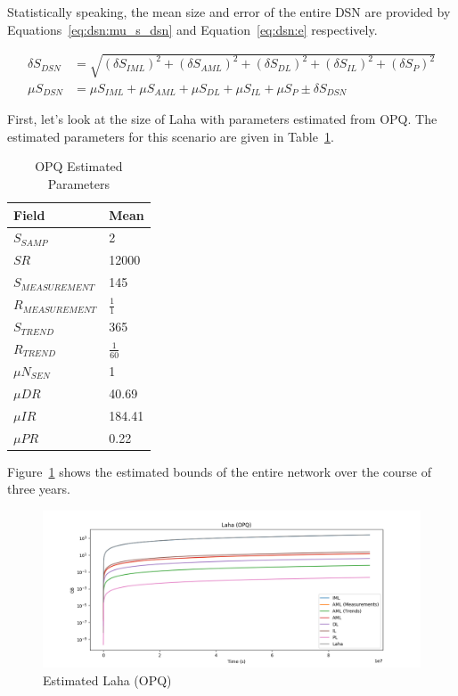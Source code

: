 Statistically speaking, the mean size and error of the entire DSN are provided by Equations~\ref{eq:dsn:mu_s_dsn} and Equation~\ref{eq:dsn:e} respectively.

\begin{align}
	\delta S_{DSN} &= \sqrt{(\delta S_{IML})^2 + (\delta S_{AML})^2 + (\delta S_{DL})^2 + (\delta S_{IL})^2 + (\delta S_{P})^2} \label{eq:dsn:e} \\
	\mu S_{DSN} &= \mu S_{IML} + \mu S_{AML} + \mu S_{DL} + \mu S_{IL} + \mu S_{P} \pm \delta S_{DSN} \label{eq:dsn:mu_s_dsn}
\end{align}

First, let's look at the size of Laha with parameters estimated from OPQ. The estimated parameters for this scenario are given in Table~\ref{table:estimated_laha_opq}.

\begin{table}[H]
	\centering
	\caption{OPQ Estimated Parameters}
	\begin{tabularx}{\textwidth}{ll}
		\toprule
		\textbf{Field} & \textbf{Mean} \\
		\midrule
		$S_{SAMP}$ & 2 \\
		$SR$ & 12000 \\
		$S_{MEASUREMENT}$ & 145 \\
		$R_{MEASUREMENT}$ & $\frac{1}{1}$ \\
		$S_{TREND}$ & 365  \\
		$R_{TREND}$ & $\frac{1}{60}$  \\
		$\mu N_{SEN}$ & 1  \\
		$\mu DR$ & 40.69  \\
		$\mu IR$ & 184.41 \\
		$\mu PR$ & 0.22 \\
		\bottomrule
	\end{tabularx}
	\label{table:estimated_laha_opq}
\end{table}

Figure~\ref{fig:plot_lala_opq} shows the estimated bounds of the entire network over the course of three years.

\begin{figure}[H]
	\centering
	\includegraphics[width=\linewidth]{figures/plot_laha_opq.png}
	\caption{Estimated Laha (OPQ)}
	\label{fig:plot_lala_opq}
\end{figure}

